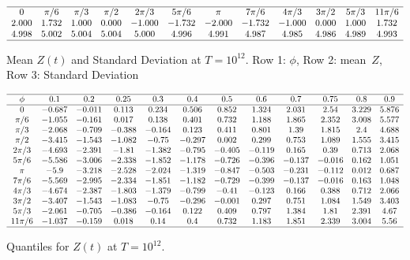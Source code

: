 \documentclass[twoside]{article}
\begin{document}
\begin{table}
\centering \(\begin{array}{cccccccccccc}

\hline
0&\pi/6 &\pi/3 &\pi/2 &2\pi/3 &5\pi/6 &\pi &7\pi/6 &4\pi/3 &3\pi/2 &5\pi/3 &11\pi/6 \\
2.000 &1.732 &1.000 &0.000 &-1.000 &-1.732 &-2.000 &-1.732 &-1.000 &0.000 &1.000 &1.732 \\
4.998&5.002&5.004&5.004&5.000&4.996&4.991&4.987&4.985&4.986&4.989&4.993 \\
\hline
\end{array}\)
\caption{Mean    $Z(t)$ and Standard Deviation at $T=10^{12}$. Row 1: $\phi$, Row 2: mean~$Z$, Row 3: Standard Deviation}
\label{tab:mean12}
\end{table}

\begin{table}
\centering \(\begin{array}{cccccccccccc}
\hline
\phi&0.1&0.2&0.25&0.3&0.4&0.5&0.6&0.7&0.75&0.8&0.9 \\
\hline
0&-0.687&-0.011&0.113&0.234&0.506&0.852&1.324&2.031&2.54&3.229&5.876\\
\pi/6 &-1.055&-0.161&0.017&0.138&0.401&0.732&1.188&1.865&2.352&3.008&5.577\\
\pi/3 &-2.068&-0.709&-0.388&-0.164&0.123&0.411&0.801&1.39&1.815&2.4&4.688\\
\pi/2 &-3.415&-1.543&-1.082&-0.75&-0.297&0.002&0.299&0.753&1.089&1.555&3.415\\
2\pi/3 &-4.693&-2.391&-1.81&-1.382&-0.795&-0.405&-0.119&0.165&0.39&0.713&2.068\\
5\pi/6 &-5.586&-3.006&-2.338&-1.852&-1.178&-0.726&-0.396&-0.137&-0.016&0.162&1.051\\
\pi &-5.9&-3.218&-2.528&-2.024&-1.319&-0.847&-0.503&-0.231&-0.112&0.012&0.687\\
7\pi/6 &-5.569&-2.995&-2.334&-1.851&-1.182&-0.729&-0.399&-0.137&-0.016&0.163&1.048\\
4\pi/3 &-4.674&-2.387&-1.803&-1.379&-0.799&-0.41&-0.123&0.166&0.388&0.712&2.066\\
3\pi/2 &-3.407&-1.543&-1.083&-0.75&-0.296&-0.001&0.297&0.751&1.084&1.549&3.403\\
5\pi/3 &-2.061&-0.705&-0.386&-0.164&0.122&0.409&0.797&1.384&1.81&2.391&4.67\\
11\pi/6 &-1.037&-0.159&0.018&0.14&0.4&0.732&1.183&1.851&2.339&3.004&5.56\\

\hline
\end{array}\)
\caption{Quantiles  for  $Z(t)$ at $T=10^{12}$.}
\label{tab:quantiles12}
\end{table}
\end{document}
